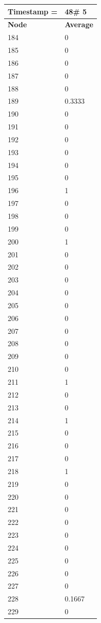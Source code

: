 \begin{tabular}{|l||l|}
\hline
\textbf{Timestamp =} & \textbf{48}\# 5\\\hline
	\textbf{Node} & \textbf{Average} \\ \hline
\hline
	184 & 0 \\ \hline
	185 & 0 \\ \hline
	186 & 0 \\ \hline
	187 & 0 \\ \hline
	188 & 0 \\ \hline
	189 & 0.3333 \\ \hline
	190 & 0 \\ \hline
	191 & 0 \\ \hline
	192 & 0 \\ \hline
	193 & 0 \\ \hline
	194 & 0 \\ \hline
	195 & 0 \\ \hline
	196 & 1 \\ \hline
	197 & 0 \\ \hline
	198 & 0 \\ \hline
	199 & 0 \\ \hline
	200 & 1 \\ \hline
	201 & 0 \\ \hline
	202 & 0 \\ \hline
	203 & 0 \\ \hline
	204 & 0 \\ \hline
	205 & 0 \\ \hline
	206 & 0 \\ \hline
	207 & 0 \\ \hline
	208 & 0 \\ \hline
	209 & 0 \\ \hline
	210 & 0 \\ \hline
	211 & 1 \\ \hline
	212 & 0 \\ \hline
	213 & 0 \\ \hline
	214 & 1 \\ \hline
	215 & 0 \\ \hline
	216 & 0 \\ \hline
	217 & 0 \\ \hline
	218 & 1 \\ \hline
	219 & 0 \\ \hline
	220 & 0 \\ \hline
	221 & 0 \\ \hline
	222 & 0 \\ \hline
	223 & 0 \\ \hline
	224 & 0 \\ \hline
	225 & 0 \\ \hline
	226 & 0 \\ \hline
	227 & 0 \\ \hline
	228 & 0.1667 \\ \hline
	229 & 0 \\ \hline
\end{tabular}
